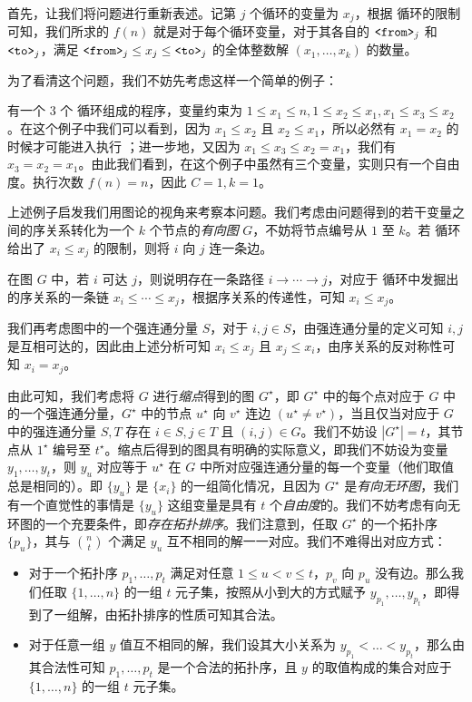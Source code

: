 \documentclass[12pt]{ctexart}
\begin{document}
首先，让我们将问题进行重新表述。记第 $j$ 个循环的变量为 $x_j$，根据 \for 循环的限制可知，我们所求的 $f(n)$ 就是对于每个循环变量，对于其各自的 ${ \texttt{<from>}}_j$ 和 ${ \texttt{<to>}}_j$，满足 ${ \texttt{<from>}}_j \le x_j \le { \texttt{<to>}}_j$ 的全体整数解 $(x_1, \dots, x_k)$ 的数量。

为了看清这个问题，我们不妨先考虑这样一个简单的例子：

\begin{example}
有一个 $3$ 个 \for 循环组成的程序，变量约束为 $1\le x_1\le n, 1\le x_2\le x_1, x_1 \le x_3\le x_2$。在这个例子中我们可以看到，因为 $x_1\le x_2$ 且 $x_2\le x_1$，所以必然有 $x_1=x_2$ 的时候才可能进入执行 \lag；进一步地，又因为 $x_1\le x_3 \le x_2=x_1$，我们有 $x_3=x_2=x_1$。由此我们看到，在这个例子中虽然有三个变量，实则只有一个自由度。执行次数 $f(n) = n$，因此 $C=1,k=1$。
\end{example}

上述例子启发我们用图论的视角来考察本问题。我们考虑由问题得到的若干变量之间的序关系转化为一个 $k$ 个节点的\emph{有向图} $G$，不妨将节点编号从 $1$ 至 $k$。若 \for 循环给出了 $x_i \le x_j$ 的限制，则将 $i$ 向 $j$ 连一条边。

在图 $G$ 中，若 $i$ 可达 $j$，则说明存在一条路径 $i \rightarrow \cdots \rightarrow j$，对应于 \for 循环中发掘出的序关系的一条链 $x_i \le \cdots \le x_j$，根据序关系的传递性，可知 $x_i\le x_j$。

我们再考虑图中的一个强连通分量 $S$，对于 $i,j\in S$，由强连通分量的定义可知 $i,j$ 是互相可达的，因此由上述分析可知 $x_i\le x_j$ 且 $x_j\le x_i$，由序关系的反对称性可知 $x_i=x_j$。

由此可知，我们考虑将 $G$ 进行\emph{缩点}得到的图 $G^{\star}$，即 $G^{\star}$ 中的每个点对应于 $G$ 中的一个强连通分量，$G^{\star}$ 中的节点 $u^\star$ 向 $v^\star$ 连边 $(u^\star \neq v^\star)$，当且仅当对应于 $G$ 中的强连通分量 $S,T$ 存在 $i\in S,j\in T$ 且 $(i,j)\in G$。我们不妨设 $|G^\star| = t$，其节点从 $1^\star$ 编号至 $t^\star$。缩点后得到的图具有明确的实际意义，即我们不妨设为变量 $y_1, \dots, y_t$，则 $y_u$ 对应等于 $u^\star$ 在 $G$ 中所对应强连通分量的每一个变量（他们取值总是相同的）。即 $\{y_u\}$ 是 $\{x_i\}$ 的一组简化情况，且因为 $G^\star$ 是\emph{有向无环图}，我们有一个直觉性的事情是 $\{y_u\}$ 这组变量是具有 $t$ 个\emph{自由度}的。我们不妨考虑有向无环图的一个充要条件，即\emph{存在拓扑排序}。我们注意到，任取 $G^\star$ 的一个拓扑序 $\{p_u\}$，其与 $\binom n t$ 个满足 $y_u$ 互不相同的解一一对应。我们不难得出对应方式：

\begin{itemize}
\item 对于一个拓扑序 $p_1, \dots, p_t$ 满足对任意 $1\le u<v\le t$，$p_v$ 向 $p_u$ 没有边。那么我们任取 $\{1,\dots,n\}$ 的一组 $t$ 元子集，按照从小到大的方式赋予 $y_{p_1},\dots,y_{p_t}$，即得到了一组解，由拓扑排序的性质可知其合法。
\item 对于任意一组 $y$ 值互不相同的解，我们设其大小关系为 $y_{p_1}<\dots<y_{p_t}$，那么由其合法性可知 $p_1, \dots, p_t$ 是一个合法的拓扑序，且 $y$ 的取值构成的集合对应于 $\{1,\dots,n\}$ 的一组 $t$ 元子集。
\end{itemize}
\end{document}
